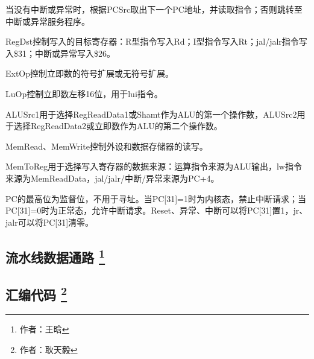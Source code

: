 \documentclass{article}
\begin{document}
            \begin{enumerate}
                \begin{item}
                    当没有中断或异常时，根据PCSrc取出下一个PC地址，并读取指令；否则跳转至中断或异常服务程序。
                \end{item}
                \begin{item}
                    RegDst控制写入的目标寄存器：R型指令写入Rd；I型指令写入Rt；jal/jalr指令写入\$31；中断或异常写入\$26。
                \end{item}
                \begin{item}
                    ExtOp控制立即数的符号扩展或无符号扩展。
                \end{item}
                \begin{item}
                    LuOp控制立即数左移16位，用于lui指令。
                \end{item}
                \begin{item}
                    ALUSrc1用于选择RegReadData1或Shamt作为ALU的第一个操作数，ALUSrc2用于选择RegReadData2或立即数作为ALU的第二个操作数。
                \end{item}
                \begin{item}
                    MemRead、MemWrite控制外设和数据存储器的读写。
                \end{item}
                \begin{item}
                    MemToReg用于选择写入寄存器的数据来源：运算指令来源为ALU输出，lw指令来源为MemReadData，jal/jalr/中断/异常来源为PC+4。
                \end{item}
                \begin{item}
                    PC的最高位为监督位，不用于寻址。当PC[31]=1时为内核态，禁止中断请求；当PC[31]=0时为正常态，允许中断请求。Reset、异常、中断可以将PC[31]置1，jr、jalr可以将PC[31]清零。
                \end{item}
            \end{enumerate}
            
        \subsection{流水线数据通路 \protect\footnote{作者：王晗}}

        \subsection{汇编代码 \protect\footnote{作者：耿天毅}}
\end{document}
